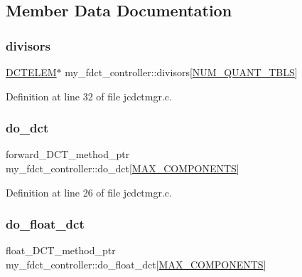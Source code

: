 \subsection{Member Data Documentation}
\mbox{\label{structmy__fdct__controller_a3355de21d37044cf0f08f44938868bde}} 
\subsubsection{\texorpdfstring{divisors}{divisors}}
{\footnotesize\ttfamily \mbox{\hyperlink{jdct_8h_a00460e5dc80a70f254891b5a8abe739f}{D\+C\+T\+E\+L\+EM}}$\ast$ my\+\_\+fdct\+\_\+controller\+::divisors\mbox{[}\mbox{\hyperlink{jpeglib_8h_ab3254a23612ea48615001fffc0c9f691}{N\+U\+M\+\_\+\+Q\+U\+A\+N\+T\+\_\+\+T\+B\+LS}}\mbox{]}}



Definition at line 32 of file jcdctmgr.\+c.

\mbox{\label{structmy__fdct__controller_a4708c82c14bc7a348520824d38f66f06}} 
\subsubsection{\texorpdfstring{do\_dct}{do\_dct}}
{\footnotesize\ttfamily forward\+\_\+\+D\+C\+T\+\_\+method\+\_\+ptr my\+\_\+fdct\+\_\+controller\+::do\+\_\+dct\mbox{[}\mbox{\hyperlink{jmorecfg_8h_a6d8c910a1fdb6d4762a05f7250e64322}{M\+A\+X\+\_\+\+C\+O\+M\+P\+O\+N\+E\+N\+TS}}\mbox{]}}



Definition at line 26 of file jcdctmgr.\+c.

\mbox{\label{structmy__fdct__controller_acaf7fa6e7d2647b35436654eb02d9bb3}} 
\subsubsection{\texorpdfstring{do\_float\_dct}{do\_float\_dct}}
{\footnotesize\ttfamily float\+\_\+\+D\+C\+T\+\_\+method\+\_\+ptr my\+\_\+fdct\+\_\+controller\+::do\+\_\+float\+\_\+dct\mbox{[}\mbox{\hyperlink{jmorecfg_8h_a6d8c910a1fdb6d4762a05f7250e64322}{M\+A\+X\+\_\+\+C\+O\+M\+P\+O\+N\+E\+N\+TS}}\mbox{]}}



